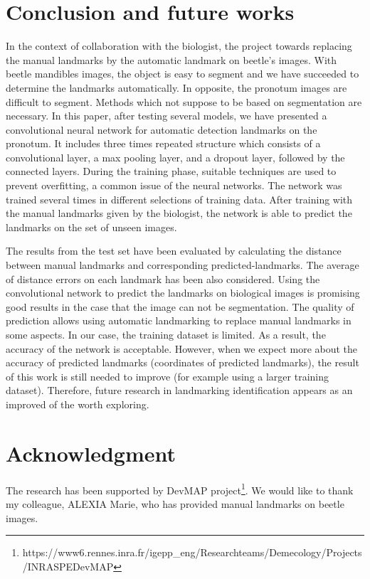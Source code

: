 \documentclass[conference]{IEEEtran}
\begin{document}
\section{Conclusion and future works}
In the context of collaboration with the biologist, the project towards replacing the manual landmarks by the automatic landmark on beetle's images. With beetle mandibles images, the object is easy to segment and we have succeeded to determine the landmarks automatically. In opposite, the pronotum images are difficult to segment. Methods which not suppose to be based on segmentation are necessary. In this paper, after testing several models, we have presented a convolutional neural network for automatic detection landmarks on the pronotum. It includes three times repeated structure which consists of a convolutional layer, a max pooling layer, and a dropout layer, followed by the connected layers. During the training phase, suitable techniques are used to prevent overfitting, a common issue of the neural networks. The network was trained several times in different selections of training data. After training with the manual landmarks given by the biologist, the network is able to predict the landmarks on the set of unseen images.

The results from the test set have been evaluated by calculating the distance between manual landmarks and corresponding predicted-landmarks. The average of distance errors on each landmark has been also considered. Using the convolutional network to predict the landmarks on biological images is promising good results in the case that the image can not be segmentation. The quality of prediction allows using automatic landmarking to replace manual landmarks in some aspects.  In our case, the training dataset is limited. As a result, the accuracy of the network is acceptable. However, when we expect more about the accuracy of predicted landmarks (coordinates of predicted landmarks), the result of this work is still needed to improve (for example using a larger training dataset). Therefore, future research in landmarking identification appears as an improved of the worth exploring.
\section*{Acknowledgment}
The research has been supported by DevMAP project\footnote{https://www6.rennes.inra.fr/igepp\_eng/Research\-teams/Demecology/Projects/INRA\-SPE\-DevMAP}. We would like to thank my colleague, ALEXIA Marie, who has provided manual landmarks on beetle images.


\end{document}
